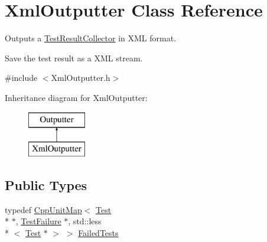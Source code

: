 \hypertarget{class_xml_outputter}{\section{Xml\-Outputter Class Reference}
\label{class_xml_outputter}
}


Outputs a \hyperlink{class_test_result_collector}{Test\-Result\-Collector} in X\-M\-L format.

Save the test result as a X\-M\-L stream.  




{\ttfamily \#include $<$Xml\-Outputter.\-h$>$}

Inheritance diagram for Xml\-Outputter\-:\begin{figure}[H]
\begin{center}
\leavevmode
\includegraphics[height=2.000000cm]{class_xml_outputter}
\end{center}
\end{figure}
\subsection*{Public Types}
\begin{DoxyCompactItemize}
\item 
typedef \hyperlink{_cpp_unit_map_8h_add33579fc7171edc27994e81eaaf7086}{Cpp\-Unit\-Map}$<$ \hyperlink{class_test}{Test} \\*
$\ast$, \hyperlink{class_test_failure}{Test\-Failure} $\ast$, std\-::less\\*
$<$ \hyperlink{class_test}{Test} $\ast$ $>$ $>$ \hyperlink{class_xml_outputter_a987608d04ba56dcc13461c9522f3da7e}{Failed\-Tests}
\end{DoxyCompactItemize}
